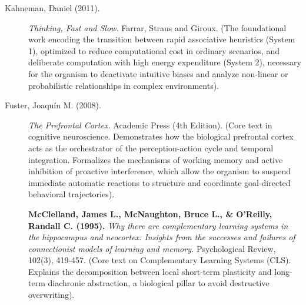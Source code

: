 \documentclass[11pt,a4paper,oneside]{article} %
\begin{document}
\begin{description}
\item[Kahneman, Daniel (2011).] \emph{Thinking, Fast and Slow.} Farrar, Straus and Giroux. (The foundational work encoding the transition between rapid associative heuristics (System 1), optimized to reduce computational cost in ordinary scenarios, and deliberate computation with high energy expenditure (System 2), necessary for the organism to deactivate intuitive biases and analyze non-linear or probabilistic relationships in complex environments).

\item[Fuster, Joaquín M. (2008).] \emph{The Prefrontal Cortex.} Academic Press (4th Edition). (Core text in cognitive neuroscience. Demonstrates how the biological prefrontal cortex acts as the orchestrator of the perception-action cycle and temporal integration. Formalizes the mechanisms of working memory and active inhibition of proactive interference, which allow the organism to suspend immediate automatic reactions to structure and coordinate goal-directed behavioral trajectories).
\end{description}

\hypertarget{a1.5-strategic-mastery-and-cls-memory-models}{%
\label{a1.5-strategic-mastery-and-cls-memory-models}}

\begin{description}
\item[] \textbf{McClelland, James L., McNaughton, Bruce L., \& O'Reilly, Randall C. (1995).} \emph{Why there are complementary learning systems in the hippocampus and neocortex: Insights from the successes and failures of connectionist models of learning and memory.} Psychological Review, 102(3), 419-457. (Core text on Complementary Learning Systems (CLS). Explains the decomposition between local short-term plasticity and long-term diachronic abstraction, a biological pillar to avoid destructive overwriting).
\end{description}

\hypertarget{a1.6-economy-of-oblivion-and-regularization-of-state-space}{%
\label{a1.6-economy-of-oblivion-and-regularization-of-state-space}}
\end{document}
